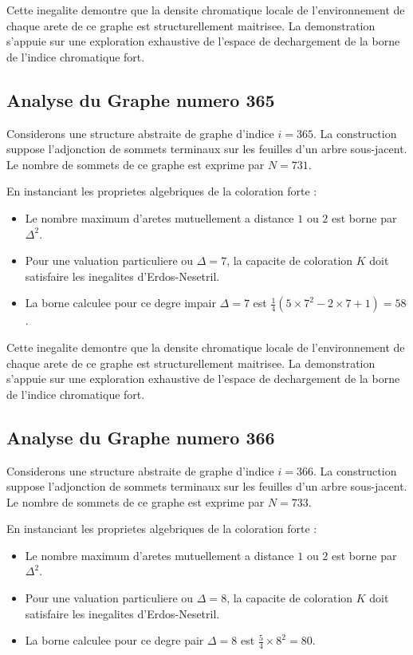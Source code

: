 \documentclass[11pt,a4paper]{article}
\begin{document}
Cette inegalite demontre que la densite chromatique locale de l'environnement de chaque arete de ce graphe est structurellement maitrisee. La demonstration s'appuie sur une exploration exhaustive de l'espace de dechargement de la borne de l'indice chromatique fort.

\subsection{Analyse du Graphe numero 365}
Considerons une structure abstraite de graphe d'indice $i = 365$. La construction suppose l'adjonction de sommets terminaux sur les feuilles d'un arbre sous-jacent. Le nombre de sommets de ce graphe est exprime par $N = 731$.

En instanciant les proprietes algebriques de la coloration forte :
\begin{itemize}
\item Le nombre maximum d'aretes mutuellement a distance $1$ ou $2$ est borne par $\Delta^2$.
\item Pour une valuation particuliere ou $\Delta = 7$, la capacite de coloration $K$ doit satisfaire les inegalites d'Erdos-Nesetril.
\item La borne calculee pour ce degre impair $\Delta = 7$ est $\frac{1}{4}(5 \times 7^2 - 2 \times 7 + 1) = 58$.
\end{itemize}

Cette inegalite demontre que la densite chromatique locale de l'environnement de chaque arete de ce graphe est structurellement maitrisee. La demonstration s'appuie sur une exploration exhaustive de l'espace de dechargement de la borne de l'indice chromatique fort.

\subsection{Analyse du Graphe numero 366}
Considerons une structure abstraite de graphe d'indice $i = 366$. La construction suppose l'adjonction de sommets terminaux sur les feuilles d'un arbre sous-jacent. Le nombre de sommets de ce graphe est exprime par $N = 733$.

En instanciant les proprietes algebriques de la coloration forte :
\begin{itemize}
\item Le nombre maximum d'aretes mutuellement a distance $1$ ou $2$ est borne par $\Delta^2$.
\item Pour une valuation particuliere ou $\Delta = 8$, la capacite de coloration $K$ doit satisfaire les inegalites d'Erdos-Nesetril.
\item La borne calculee pour ce degre pair $\Delta = 8$ est $\frac{5}{4} \times 8^2 = 80$.
\end{itemize}
\end{document}
